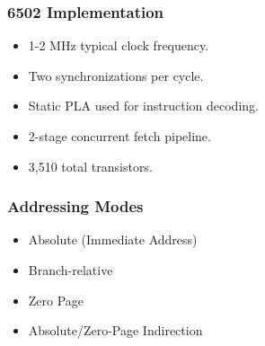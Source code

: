 \documentclass{beamer}
\begin{document}
\begin{frame}
\frametitle{6502 Implementation}
\begin{itemize}
\item 1-2 MHz typical clock frequency.
\item Two synchronizations per cycle.
\item Static PLA used for instruction decoding.
\item 2-stage concurrent fetch pipeline.
\item 3,510 total transistors.
\end{itemize}
\end{frame}

\begin{frame}
\frametitle{Addressing Modes}
\begin{itemize}
\item Absolute (Immediate Address)
\item Branch-relative
\item Zero Page
\item Absolute/Zero-Page Indirection
\end{itemize}
\end{frame}
\end{document}
